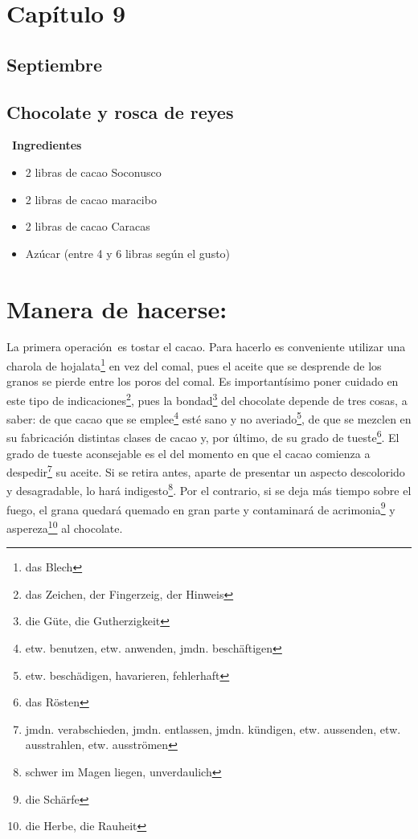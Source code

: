 \clearpage

\section*{ Capítulo 9 }
\subsection*{ Septiembre }
\subsection*{ Chocolate y rosca de reyes }~\textbf{Ingredientes}
\begin{itemize}
    \item 2 libras de cacao Soconusco
    \item 2 libras de cacao maracibo
    \item 2 libras de cacao Caracas
    \item Azúcar (entre 4 y 6 libras según el gusto)
\end{itemize}

\section*{ Manera de hacerse: }
La primera operación~es tostar el cacao. Para hacerlo es
conveniente utilizar una charola de hojalata\footnote{das Blech}
en vez del comal, pues el aceite que se desprende de los granos se pierde
entre los poros del comal.
Es importantísimo poner cuidado en este tipo de indicaciones\footnote{das Zeichen, der Fingerzeig, der Hinweis},
pues la bondad\footnote{die Güte, die Gutherzigkeit} del
chocolate depende de tres cosas, a saber: de que cacao que se emplee\footnote{etw. benutzen, etw. anwenden, jmdn. beschäftigen}
esté sano y no averiado\footnote{etw. beschädigen, havarieren, fehlerhaft},
de que se mezclen en su fabricación distintas clases de cacao y, por
último, de su grado de tueste\footnote{das Rösten}.
El grado de tueste aconsejable es el del momento en que el cacao
comienza a despedir\footnote{jmdn. verabschieden, jmdn. entlassen, jmdn. kündigen, etw. aussenden, etw. ausstrahlen, etw. ausströmen}
su aceite. Si se retira antes, aparte de presentar
un aspecto descolorido y desagradable, lo hará indigesto\footnote{schwer im Magen liegen, unverdaulich}.
Por el contrario, si se deja más tiempo sobre el fuego, el grana quedará
quemado en gran parte y contaminará de acrimonia\footnote{die Schärfe}
y aspereza\footnote{die Herbe, die Rauheit} al chocolate.

